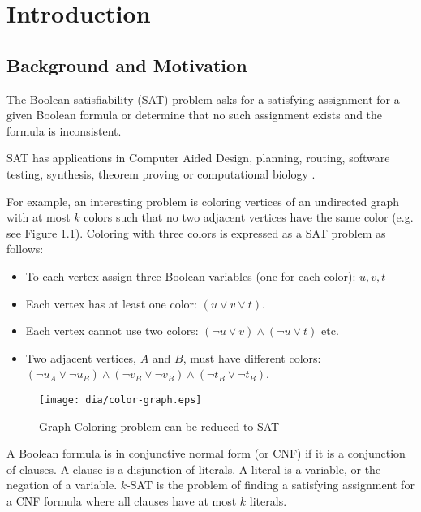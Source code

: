 \chapter{Introduction}

\section{Background and Motivation}

The Boolean satisfiability (SAT) problem asks for a satisfying
assignment for a given Boolean formula or determine
that no such assignment exists and the formula is inconsistent.

SAT has applications in Computer Aided Design,
planning, routing, software testing, synthesis, theorem
proving or computational biology \cite{Smith_diagnosis,
Soeken:2010:VUM:1870926.1871248, demoura2008z3, Corblin07asat-based,
Kautz:1992:PS:145448.146725}.

For example, an interesting problem is coloring vertices
of an undirected graph with at most $k$ colors such that no
two adjacent vertices have the same color (e.g. see Figure
\ref{fig:color-graph}). Coloring with three colors is expressed as
a SAT problem as follows:
\begin{itemize}
  \item To each vertex assign three Boolean variables (one for each color): $u, v, t$
  \item Each vertex has at least one color: $(u \lor v \lor t)$.
  \item Each vertex cannot use two colors:
  $(\neg u \lor v) \land (\neg u \lor t)$ etc.
  \item Two adjacent vertices, $A$ and $B$, must have different colors:
  $(\neg u_A \lor \neg u_B) \land (\neg v_B \lor \neg v_B) \land (\neg t_B \lor \neg t_B)$.
\end{itemize}

\begin{figure}
  \centering
  \texttt{[image: dia/color-graph.eps]}
  \caption{Graph Coloring problem can be reduced to SAT}
  \label{fig:color-graph}
\end{figure}

A Boolean formula is in conjunctive normal form (or
CNF) if it is a conjunction of clauses. A clause is a disjunction
of literals. A literal is a variable, or the negation of a
variable. $k$-SAT is the problem of finding a satisfying assignment
for a CNF formula where all clauses have at most $k$ literals.

